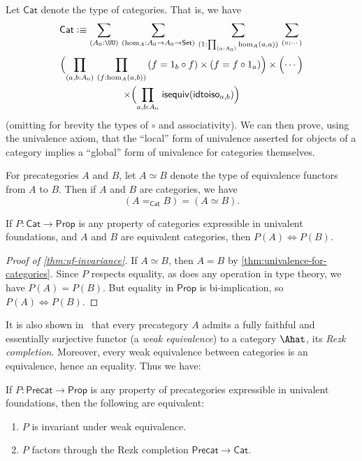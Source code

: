 \documentclass{amsart}
\begin{document}
Let $\mathsf{Cat}$ denote the type of categories.
That is, we have
\begin{multline*}
\mathsf{Cat} \defeq
\sm{A_0:\UU}{\hom_A:A_0\to A_0\to\mathsf{Set}}{1:\prd{a:A_0}\hom_A(a,a)}{\circ:\cdots}\\
\Parens{\prd{a,b:A_0}{f:\hom_A(a,b)} (f=1_b\circ f) \times (f = f\circ 1_a)}
\times \Parens{\cdots }\\
\times \Parens{\prd{a,b:A_0} \mathsf{isequiv} (\mathsf{idtoiso}_{a,b})}
\end{multline*}
(omitting for brevity the types of $\circ$ and associativity).
We can then prove, using the univalence axiom, that the ``local'' form of univalence asserted for objects of a category implies a ``global'' form of univalence for categories themselves.

\begin{thm}\label{thm:univalence-for-categories}
  For precategories $A$ and $B$, let $A\simeq B$ denote the type of equivalence functors from $A$ to $B$.
  Then if $A$ and $B$ are categories, we have
  \[ (A=_{\mathsf{Cat}}B) = (A\simeq B). \]
\end{thm}

\begin{cor}\label{thm:uf-invariance}
  If $P:\mathsf{Cat} \to \mathsf{Prop}$ is any property of categories expressible in univalent foundations, and $A$ and $B$ are equivalent categories, then $P(A) \Leftrightarrow P(B)$.
\end{cor}
\begin{proof}[Proof of \autoref{thm:uf-invariance}]
  If $A\simeq B$, then $A=B$ by \autoref{thm:univalence-for-categories}.
  Since $P$ respects equality, as does any operation in type theory, we have $P(A)=P(B)$.
  But equality in $\mathsf{Prop}$ is bi-implication, so $P(A) \Leftrightarrow P(B)$.
\end{proof}

It is also shown in~\cite{aks:rezk,hottbook} that every precategory $A$ admits a fully faithful and essentially surjective functor (a \emph{weak equivalence}) to a category $\Ahat$, its \emph{Rezk completion}.
Moreover, every weak equivalence between categories is an equivalence, hence an equality.
Thus we have:

\begin{cor}
  If $P:\mathsf{Precat}\to\mathsf{Prop}$ is any property of precategories expressible in univalent foundations, then the following are equivalent:
  \begin{enumerate}
  \item $P$ is invariant under weak equivalence.
  \item $P$ factors through the Rezk completion $\mathsf{Precat}\to \mathsf{Cat}$.
  \end{enumerate}
\end{cor}
\end{document}
